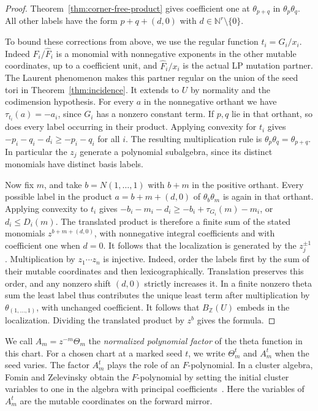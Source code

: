 \documentclass[11pt,reqno]{amsart}
\numberwithin{equation}{section}
\theoremstyle{definition}
\theoremstyle{remark}
\begin{document}
\begin{proof}
Theorem~\ref{thm:corner-free-product} gives coefficient one at
\(\theta_{p+q}\) in \(\theta_p\theta_q\). All other labels have the
form \(p+q+(d,0)\) with \(d\in\mathbb N^r\setminus\{0\}\).

To bound these corrections from above, we use the regular function \(t_i=G_i/x_i\).
Indeed \(F_i/\widehat F_i\) is a monomial with nonnegative
exponents in the other mutable coordinates, up to a coefficient
unit, and \(\widehat F_i/x_i\) is the actual LP mutation partner.
The Laurent phenomenon makes this partner regular on the union of
the seed tori in Theorem~\ref{thm:incidence}. It extends to \(U\)
by normality and the codimension hypothesis.
For every \(a\) in the nonnegative orthant we have
\(\tau_{t_i}(a)=-a_i\), since \(G_i\) has a nonzero constant
term. If \(p,q\) lie in that orthant, so does every label occurring in their product. Applying
convexity for \(t_i\) gives \(-p_i-q_i-d_i\ge-p_i-q_i\) for all
\(i\). The resulting multiplication rule is
\(\theta_p\theta_q=\theta_{p+q}\). In particular the \(z_j\)
generate a polynomial subalgebra, since its distinct monomials have
distinct basis labels.

Now fix \(m\), and take \(b=N(1,\ldots,1)\) with \(b+m\) in the
positive orthant. Every possible label in the product
\(a=b+m+(d,0)\) of \(\theta_b\theta_m\) is again in that orthant.
Applying convexity to \(t_i\) gives
\(-b_i-m_i-d_i\ge-b_i+\tau_{G_i}(m)-m_i\), or \(d_i\le D_i(m)\).
The translated product is therefore a finite sum of the stated
monomials \(z^{b+m+(d,0)}\), with nonnegative integral coefficients
and with coefficient one when \(d=0\). It follows that the localization is generated by the \(z_j^{\pm1}\).
Multiplication by \(z_1\cdots z_n\) is injective. Indeed, order the
labels first by the sum of their mutable coordinates and then
lexicographically. Translation preserves this order, and any
nonzero shift \((d,0)\) strictly increases it. In a finite nonzero
theta sum the least label thus contributes the unique least term
after multiplication by \(\theta_{(1,\ldots,1)}\), with unchanged
coefficient. It follows that \(B_{\mathbb Z}(U)\) embeds in the localization.
Dividing the translated product by \(z^b\) gives the formula.
\end{proof}

We call \(A_m=z^{-m}\Theta_m\) the \emph{normalized polynomial factor}
of the theta function in this chart. For a chosen chart at a marked
seed \(t\), we write \(\Theta_m^t\) and \(A_m^t\) when the seed varies.
The factor \(A_m^t\) plays the role of an \(F\)-polynomial.
In a cluster algebra, Fomin and Zelevinsky obtain the \(F\)-polynomial
by setting the initial cluster variables to one in the algebra with
principal coefficients~\cite[Definition~3.3]{FZIV}. Here the variables
of \(A_m^t\) are the mutable coordinates on the forward mirror.
\end{document}
